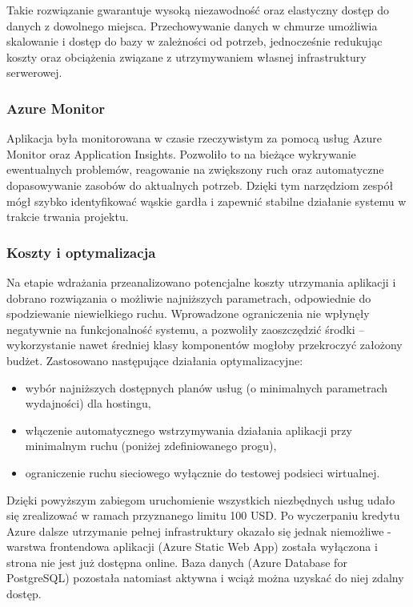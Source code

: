 \documentclass[a4paper,twoside,12pt]{book}
\begin{document}
Takie rozwiązanie gwarantuje wysoką niezawodność oraz elastyczny dostęp do danych z dowolnego miejsca. Przechowywanie danych w chmurze umożliwia skalowanie i dostęp do bazy w zależności od potrzeb, jednocześnie redukując koszty oraz obciążenia związane z utrzymywaniem własnej infrastruktury serwerowej.

\subsubsection{Azure Monitor}
Aplikacja była monitorowana w czasie rzeczywistym za pomocą usług Azure Monitor oraz Application Insights. Pozwoliło to na bieżące wykrywanie ewentualnych problemów, reagowanie na zwiększony ruch oraz automatyczne dopasowywanie zasobów do aktualnych potrzeb. Dzięki tym narzędziom zespół mógł szybko identyfikować wąskie gardła i zapewnić stabilne działanie systemu w trakcie trwania projektu.

\subsubsection{Koszty i optymalizacja}
Na etapie wdrażania przeanalizowano potencjalne koszty utrzymania aplikacji i dobrano rozwiązania o możliwie najniższych parametrach, odpowiednie do spodziewanie niewielkiego ruchu. Wprowadzone ograniczenia nie wpłynęły negatywnie na funkcjonalność systemu, a pozwoliły zaoszczędzić środki – wykorzystanie nawet średniej klasy komponentów mogłoby przekroczyć założony budżet. Zastosowano następujące działania optymalizacyjne:

\begin{itemize}
    \item wybór najniższych dostępnych planów usług (o minimalnych parametrach wydajności) dla hostingu,
    \item włączenie automatycznego wstrzymywania działania aplikacji przy minimalnym ruchu (poniżej zdefiniowanego progu),
    \item ograniczenie ruchu sieciowego wyłącznie do testowej podsieci wirtualnej.
\end{itemize}

Dzięki powyższym zabiegom uruchomienie wszystkich niezbędnych usług udało się zrealizować w ramach przyznanego limitu 100 USD. Po wyczerpaniu kredytu Azure dalsze utrzymanie pełnej infrastruktury okazało się jednak niemożliwe - warstwa frontendowa aplikacji (Azure Static Web App) została wyłączona i strona nie jest już dostępna online. Baza danych (Azure Database for PostgreSQL) pozostała natomiast aktywna i wciąż można uzyskać do niej zdalny dostęp.
\end{document}
